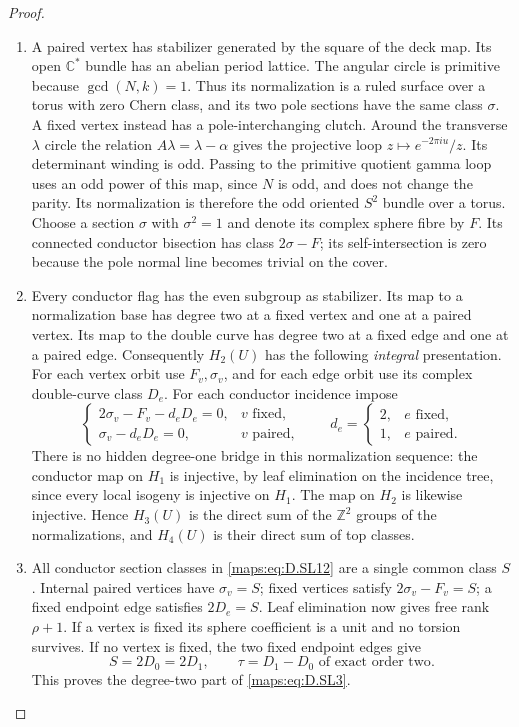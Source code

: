 \begin{proof}
\begin{enumerate}[label=\arabic*.,leftmargin=*]
\item A paired vertex has stabilizer generated by
the square of the deck map. Its open
$\mathbb C^*$ bundle has an abelian period
lattice. The angular circle is primitive
because $\gcd(N,k)=1$. Thus its normalization
is a ruled surface over a torus with zero
Chern class, and its two pole sections have
the same class $\sigma$.
A fixed vertex instead has a pole-interchanging
clutch. Around the transverse $\lambda$ circle
the relation $A\lambda=\lambda-\alpha$ gives
the projective loop
$z\mapsto e^{-2\pi i u}/z$.
Its determinant winding is odd. Passing to
the primitive quotient gamma loop uses an
odd power of this map, since $N$ is odd, and
does not change the parity. Its normalization
is therefore the odd oriented $S^2$ bundle
over a torus. Choose a section $\sigma$ with
$\sigma^2=1$ and denote its complex sphere
fibre by $F$. Its connected conductor
bisection has class $2\sigma-F$; its
self-intersection is zero because the pole
normal line becomes trivial on the cover.

\item Every conductor flag has the even subgroup
as stabilizer. Its map to a normalization
base has degree two at a fixed vertex and
one at a paired vertex. Its map to the
double curve has degree two at a fixed edge
and one at a paired edge. Consequently
$H_2(U)$ has the following \emph{integral}
presentation. For each vertex orbit use
$F_v,\sigma_v$, and for each edge orbit use
its complex double-curve class $D_e$.
For each conductor incidence impose
\[
 \begin{cases}
 2\sigma_v-F_v-d_eD_e=0,&v\text{ fixed},\\
 \sigma_v-d_eD_e=0,&v\text{ paired},
 \end{cases}
 \qquad d_e=\begin{cases}2,&e\text{ fixed},\\1,&e\text{ paired}.
 \end{cases}                                             \tag{D.SL12}\label{maps:eq:D.SL12}
\]
There is no hidden degree-one bridge in this
normalization sequence: the conductor map
on $H_1$ is injective, by leaf elimination
on the incidence tree, since every local
isogeny is injective on $H_1$. The map on
$H_2$ is likewise injective. Hence
$H_3(U)$ is the direct sum of the
$\mathbb Z^2$ groups of the normalizations,
and $H_4(U)$ is their direct sum of top
classes.

\item All conductor section classes in \eqref{maps:eq:D.SL12}
are a single common class $S$. Internal
paired vertices have $\sigma_v=S$;
fixed vertices satisfy $2\sigma_v-F_v=S$;
a fixed endpoint edge satisfies $2D_e=S$.
Leaf elimination now gives free rank
$\rho+1$. If a vertex is fixed its sphere
coefficient is a unit and no torsion
survives. If no vertex is fixed, the two
fixed endpoint edges give
\[
 S=2D_0=2D_1,\qquad
       \tau=D_1-D_0\text{ of exact order two}.             \tag{D.SL13}\label{maps:eq:D.SL13}
\]
This proves the degree-two part of \eqref{maps:eq:D.SL3}.


\end{enumerate}
\end{proof}
